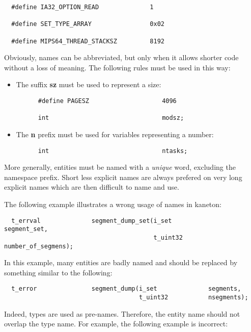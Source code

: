 \begin{verbatim}
  #define IA32_OPTION_READ              1

  #define SET_TYPE_ARRAY                0x02

  #define MIPS64_THREAD_STACKSZ         8192
\end{verbatim}

Obviously, names can be abbreviated, but only when it allows shorter code
without a loss of meaning. The following rules must be used in this way:

\begin{itemize}
  \item
    The suffix \textbf{sz} must be used to represent a size:

    \begin{verbatim}
      #define PAGESZ                    4096

      int                               modsz;
    \end{verbatim}
  \item
    The \textbf{n} prefix must be used for variables representing a number:

    \begin{verbatim}
      int                               ntasks;
    \end{verbatim}
\end{itemize}

More generally, entities must be named with a \textit{unique} word,
excluding the namespace prefix. Short less explicit names are always prefered
on very long explicit names which are then difficult to name and use.

The following example illustrates a wrong usage of names in kaneton:

\begin{verbatim}
  t_errval              segment_dump_set(i_set              segment_set,
                                         t_uint32           number_of_segmens);
\end{verbatim}

In this example, many entities are badly named and should be replaced by
something similar to the following:

\begin{verbatim}
  t_error               segment_dump(i_set              segments,
                                     t_uint32           nsegments);
\end{verbatim}

Indeed, types are used as pre-names. Therefore, the entity name should
not overlap the type name. For example, the following example is incorrect:

